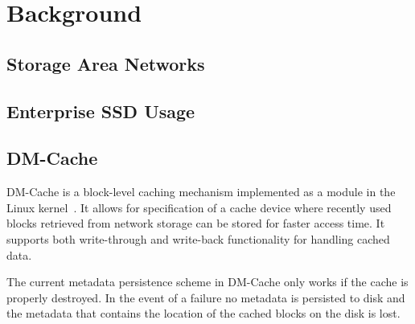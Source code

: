 \section{Background}

\subsection{Storage Area Networks}

\subsection{Enterprise SSD Usage}

\subsection{DM-Cache}

DM-Cache is a block-level caching mechanism implemented as a module in
the Linux kernel~\cite{DM-Cache}. It allows for specification of a
cache device where recently used blocks retrieved from network storage
can be stored for faster access time. It supports both write-through
and write-back functionality for handling cached data.

The current metadata persistence scheme in DM-Cache only works if the
cache is properly destroyed. In the event of a failure no metadata is
persisted to disk and the metadata that contains the location of the
cached blocks on the disk is lost.

